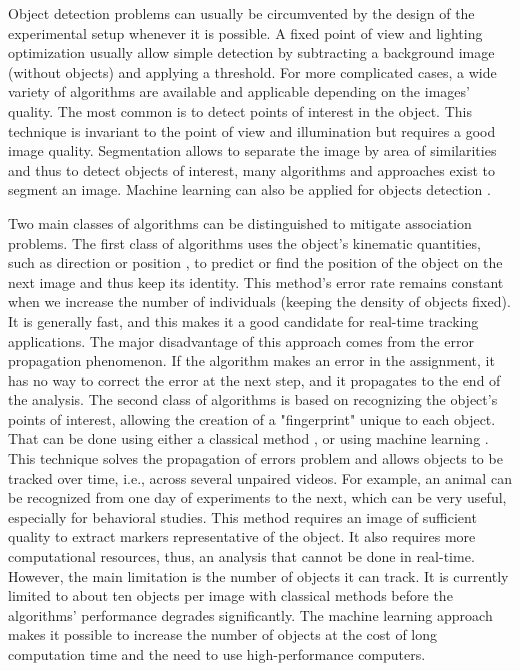     Object detection problems can usually be circumvented by the design of the experimental setup whenever it is possible. A fixed point of view and lighting optimization usually allow simple detection by subtracting a background image (without objects) and applying a threshold. For more complicated cases, a wide variety of algorithms are available \cite{yilmaz2006object} and applicable depending on the images' quality. The most common is to detect points of interest in the object. This technique is invariant to the point of view and illumination but requires a good image quality. Segmentation allows to separate the image by area of similarities and thus to detect objects of interest, many algorithms and approaches exist to segment an image. Machine learning can also be applied for objects detection \cite{zhao2019object}.

    Two main classes of algorithms can be distinguished to mitigate association problems. The first class of algorithms uses the object's kinematic quantities, such as direction or position \cite{qian2016effective}, to predict or find the position of the object on the next image and thus keep its identity. This method's error rate remains constant when we increase the number of individuals (keeping the density of objects fixed). It is generally fast, and this makes it a good candidate for real-time tracking applications. The major disadvantage of this approach comes from the error propagation phenomenon. If the algorithm makes an error in the assignment, it has no way to correct the error at the next step, and it propagates to the end of the analysis.
    The second class of algorithms is based on recognizing the object's points of interest, allowing the creation of a "fingerprint" unique to each object. That can be done using either a classical method \cite{perez2014idtracker, bai2018automatic}, or using machine learning \cite{mathis2018deeplabcut, romero2019idtracker}. This technique solves the propagation of errors problem and allows objects to be tracked over time, i.e., across several unpaired videos. For example, an animal can be recognized from one day of experiments to the next, which can be very useful, especially for behavioral studies. This method requires an image of sufficient quality to extract markers representative of the object. It also requires more computational resources, thus, an analysis that cannot be done in real-time. However, the main limitation is the number of objects it can track. It is currently limited to about ten objects per image with classical methods before the algorithms' performance degrades significantly. The machine learning approach makes it possible to increase the number of objects at the cost of long computation time and the need to use high-performance computers.

